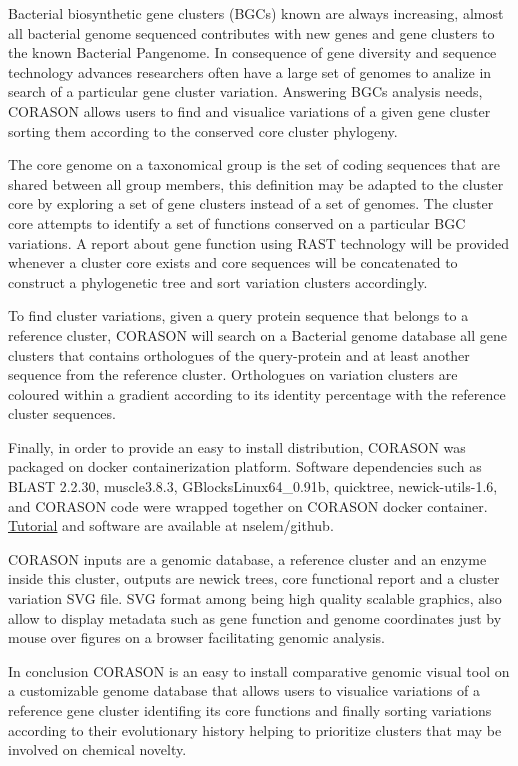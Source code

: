 \documentclass[12pt,twoside]{reedthesis}
\begin{document}
  Bacterial biosynthetic gene clusters (BGCs) known are always increasing,
  almost all bacterial genome sequenced contributes with new genes and
  gene clusters to the known Bacterial Pangenome. In consequence of gene
  diversity and sequence technology advances researchers often have a
  large set of genomes to analize in search of a particular gene cluster
  variation. Answering BGCs analysis needs, CORASON allows users to find
  and visualice variations of a given gene cluster sorting them according
  to the conserved core cluster phylogeny.
  
  The core genome on a taxonomical group is the set of coding sequences
  that are shared between all group members, this definition may be
  adapted to the cluster core by exploring a set of gene clusters instead
  of a set of genomes. The cluster core attempts to identify a set of
  functions conserved on a particular BGC variations. A report about gene
  function using RAST technology will be provided whenever a cluster core
  exists and core sequences will be concatenated to construct a
  phylogenetic tree and sort variation clusters accordingly.
  
  To find cluster variations, given a query protein sequence that belongs
  to a reference cluster, CORASON will search on a Bacterial genome
  database all gene clusters that contains orthologues of the
  query-protein and at least another sequence from the reference cluster.
  Orthologues on variation clusters are coloured within a gradient
  according to its identity percentage with the reference cluster
  sequences.
  
  Finally, in order to provide an easy to install distribution, CORASON
  was packaged on docker containerization platform. Software dependencies
  such as BLAST 2.2.30, muscle3.8.3, GBlocksLinux64\_0.91b, quicktree,
  newick-utils-1.6, and CORASON code were wrapped together on CORASON
  docker container.
  \href{https://github.com/nselem/EvoDivMet/wiki}{Tutorial} and software
  are available at nselem/github.
  
  CORASON inputs are a genomic database, a reference cluster and an enzyme
  inside this cluster, outputs are newick trees, core functional report
  and a cluster variation SVG file. SVG format among being high quality
  scalable graphics, also allow to display metadata such as gene function
  and genome coordinates just by mouse over figures on a browser
  facilitating genomic analysis.
  
  In conclusion CORASON is an easy to install comparative genomic visual
  tool on a customizable genome database that allows users to visualice
  variations of a reference gene cluster identifing its core functions and
  finally sorting variations according to their evolutionary history
  helping to prioritize clusters that may be involved on chemical novelty.
  
\end{document}
